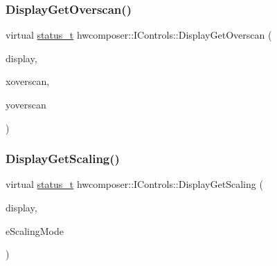 \subsubsection{\texorpdfstring{Display\+Get\+Overscan()}{DisplayGetOverscan()}}
{\footnotesize\ttfamily virtual \mbox{\hyperlink{hwcserviceapi_8h_a3806fb2027d9a316d8ca8d9b8b8eb96f}{status\+\_\+t}} hwcomposer\+::\+I\+Controls\+::\+Display\+Get\+Overscan (\begin{DoxyParamCaption}\item[{uint32\+\_\+t}]{display,  }\item[{int32\+\_\+t $\ast$}]{xoverscan,  }\item[{int32\+\_\+t $\ast$}]{yoverscan }\end{DoxyParamCaption})\hspace{0.3cm}{\ttfamily [pure virtual]}}

\mbox{\label{classhwcomposer_1_1IControls_a341b79ec50b6145db4f46d1cd878b47c}} 
\subsubsection{\texorpdfstring{Display\+Get\+Scaling()}{DisplayGetScaling()}}
{\footnotesize\ttfamily virtual \mbox{\hyperlink{hwcserviceapi_8h_a3806fb2027d9a316d8ca8d9b8b8eb96f}{status\+\_\+t}} hwcomposer\+::\+I\+Controls\+::\+Display\+Get\+Scaling (\begin{DoxyParamCaption}\item[{uint32\+\_\+t}]{display,  }\item[{\mbox{\hyperlink{hwcserviceapi_8h_acdadfd5e7f15097833789174e442083f}{E\+Hwcs\+Scaling\+Mode}} $\ast$}]{e\+Scaling\+Mode }\end{DoxyParamCaption})\hspace{0.3cm}{\ttfamily [pure virtual]}}

\mbox{\label{classhwcomposer_1_1IControls_a89180fa507885f5d7ed1d02595f2be49}} 
